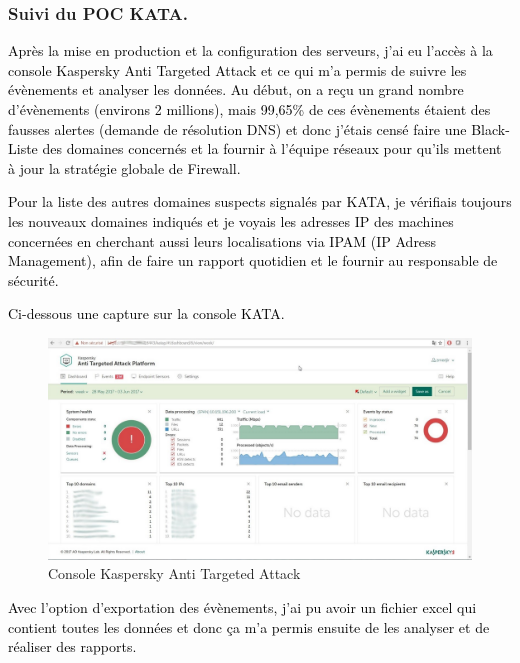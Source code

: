 \documentclass[a4paper,12pt]{report}
\begin{document}
\subsubsection{Suivi du POC KATA. }
\textcolor{black}{Après la mise en production et la configuration des serveurs, j’ai eu l’accès à la console Kaspersky Anti Targeted Attack et ce qui m’a permis de suivre les évènements et analyser les données. }
\textcolor{black}{Au début, on a reçu un grand nombre d'évènements (environs 2 millions), mais 99,65\% de ces évènements étaient des fausses alertes (demande de résolution DNS) et donc j’étais censé faire une Black-Liste des domaines concernés et la fournir à l’équipe réseaux pour qu’ils mettent à jour la stratégie globale de Firewall.}

\textcolor{black}{Pour la liste des autres domaines suspects signalés par KATA, je vérifiais toujours les nouveaux domaines indiqués et je voyais les adresses IP des machines concernées en cherchant aussi leurs localisations via IPAM (IP Adress Management), afin de faire un rapport quotidien et le fournir au responsable de sécurité. }

\textcolor{black}{Ci-dessous une capture sur la console KATA.}

\begin{figure}[H]
	\begin{center}
		\includegraphics[width=1\linewidth]{Projet_KATA/console_kata}
\end{center}
	\caption{Console Kaspersky Anti Targeted Attack}
	\label{fig:9}	
\end{figure}		 
		 

\textcolor{black}{Avec l’option d’exportation des évènements, j’ai pu avoir un fichier excel qui contient toutes les données et donc ça m'a permis ensuite de les analyser et de réaliser des rapports.}
\end{document}
